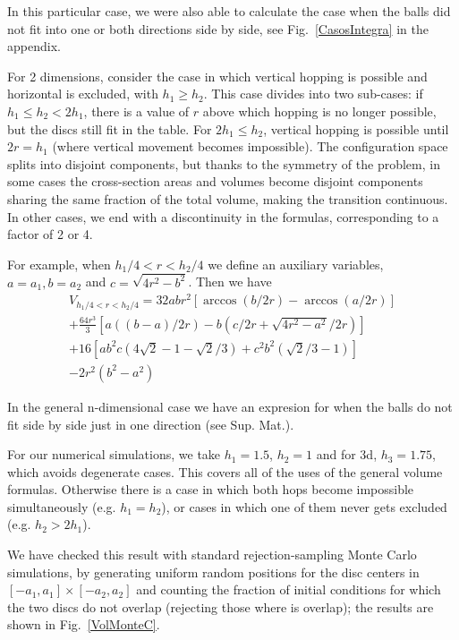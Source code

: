 \documentclass[superscriptaddress,pre,reprint,showpacs,twocolumn]{revtex4-1}
\begin{document}
In this particular case, we were also able to calculate the case when the balls
did not fit into one or both directions side by side,
see Fig.~\ref{CasosIntegra} in the appendix. 

For 2 dimensions, 
consider the case  in which vertical hopping is possible
and horizontal is excluded, with  $h_1 \geq h_2$.
This case divides into two sub-cases: if
$ h_1 \leq  h_2 < 2 h_1 $,
there is a value of $r$ above which hopping is no longer possible,
but the discs still fit in the table. For $2 h_1 \leq h_2 $, vertical hopping is
possible until $ 2 r= h_1$ (where vertical movement becomes impossible). 
The configuration space splits into disjoint components, but 
thanks to the symmetry of
the problem, in some cases the cross-section areas and 
volumes become disjoint components sharing the same fraction of
the total volume, making the transition continuous. In other cases, we end with 
a discontinuity in the formulas,
corresponding to a factor of 2 or 4. 


For example, when $h_1/4 < r < h_2/4$ 
we define an auxiliary variables, $a=a_1, b=a_2$
and
$c = \sqrt{4r^2-b^2}$. Then we have
\begin{multline}\label{VolumenCasoFeo}
V_{h_1/4<r<h_2/4} = 32abr^2 \left[ \arccos(b/2r)-\arccos(a/2r) \right]\\
+\frac{64 r^3}{3 } \left[ a((b-a)/2r)-b(c/2r+\sqrt{4r^2-a^2}/2r) \right]\\
+16 \left[ a b^2 c (4\sqrt{2}-1-\sqrt{2}/3) 
  +c^2b^2 (\sqrt{2}/3-1) \right]\\
-2r^2 (b^2-a^2)
\end{multline}

In the general n-dimensional case we have an expresion for when the balls
do not fit side by side just in one direction (see Sup. Mat.).

For our numerical simulations, we take $h_1=1.5$, $h_2=1$ and for 3d, $h_3=1.75$,
which avoids degenerate cases. 
This covers all of the uses of the general volume formulas.
Otherwise there is a case in which both hops become impossible simultaneously
(e.g. $h_1=h_2$), or cases in which one of them never gets excluded (e.g. $h_2>2h_1$).


We have checked this result with standard rejection-sampling Monte Carlo simulations, 
by generating uniform random positions for the disc centers in 
$[-a_1,a_1] \times [-a_2,a_2]$ and 
counting the fraction of initial conditions for 
which the two discs do not overlap (rejecting those where is overlap); the results are shown in Fig.~\ref{VolMonteC}.
\end{document}
